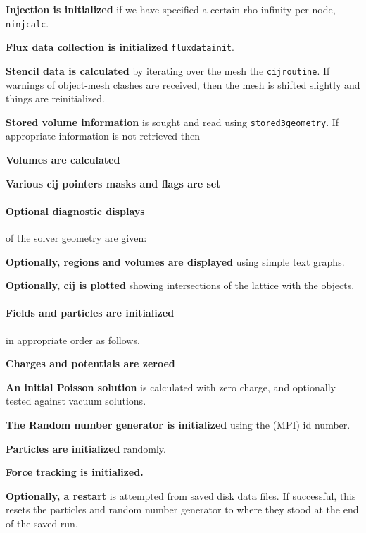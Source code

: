 \documentclass[12pt]{article}
\def\sentence#1{\par\noindent\textbf{#1}}
\begin{document}
\sentence{Injection is initialized} if we have specified a certain
rho-infinity per node, \verb!ninjcalc!.

\sentence{Flux data collection is initialized} \verb!fluxdatainit!.

\sentence{Stencil data is calculated} by iterating over the mesh the
\verb!cijroutine!. If warnings of object-mesh clashes are received,
then the mesh is shifted slightly and things are reinitialized.

\sentence{Stored volume information} is sought and read using
\verb!stored3geometry!. If appropriate information is not retrieved then

\sentence{Volumes are calculated}

\sentence{Various cij pointers masks and flags are set}

\paragraph{Optional diagnostic displays} of the solver geometry are given:

\sentence{Optionally, regions and volumes are displayed} using simple text
graphs. 

\sentence{Optionally, cij is plotted} showing intersections of the
lattice with the objects.

\paragraph{Fields and particles are initialized} in appropriate order
as follows.

\sentence{Charges and potentials are zeroed}

\sentence{An initial Poisson solution} is calculated with zero
charge, and optionally tested against vacuum solutions.

\sentence{The Random number generator is initialized} using the (MPI) id
number. 

\sentence{Particles are initialized} randomly.

\sentence{Force tracking is initialized.}

\sentence{Optionally, a restart} is attempted from saved disk data
files. If successful, this resets the particles and random number
generator to where they stood at the end of the saved run.
\end{document}
